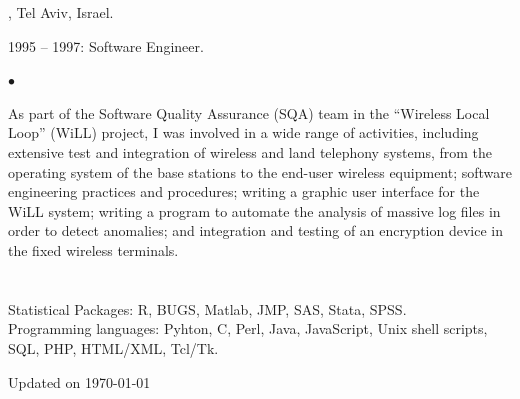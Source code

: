 \documentclass[12pt,a4paper]{article}
\newcommand{\headingfont}{\Large\color{OliveGreen}}
\newenvironment{list1}{
  \begin{list}{\ding{113}}{%
      \setlength{\itemsep}{0in}
      \setlength{\parsep}{0in} \setlength{\parskip}{0in}
      \setlength{\topsep}{0in} \setlength{\partopsep}{0in}
      \setlength{\leftmargin}{0.17in}}}{\end{list}}
\newenvironment{list2}{
  \begin{list}{$\bullet$}{%
      \setlength{\itemsep}{0in}
      \setlength{\parsep}{0in} \setlength{\parskip}{0in}
      \setlength{\topsep}{0in} \setlength{\partopsep}{0in}
      \setlength{\leftmargin}{0.2in}}}{\end{list}}
\begin{document}
, Tel Aviv, Israel.
\begin{list1}
\item[]  1995 -- 1997:  Software Engineer.
\begin{list2}
\item[] As part of the Software Quality Assurance (SQA) team in the ``Wireless Local
Loop'' (WiLL) project, I was involved in a wide range of activities, including
extensive test and integration of wireless and land telephony systems, from the
operating system of the base stations to the end-user wireless equipment;
software engineering practices and procedures; writing a graphic user interface
for the WiLL system; writing a program to automate the analysis of massive log
files in order to detect anomalies;
and integration and testing of an encryption device in the fixed wireless
terminals.
\end{list2}
\end{list1}



\section*{\sc{\headingfont Other Skills}}
Statistical Packages:  R, BUGS, Matlab, JMP, SAS, Stata, SPSS.\\
Programming languages:  Pyhton, C, Perl, Java, JavaScript, Unix shell scripts, SQL, PHP,
HTML/XML, Tcl/Tk.

\vspace{2in}
Updated on \today
\end{document}
